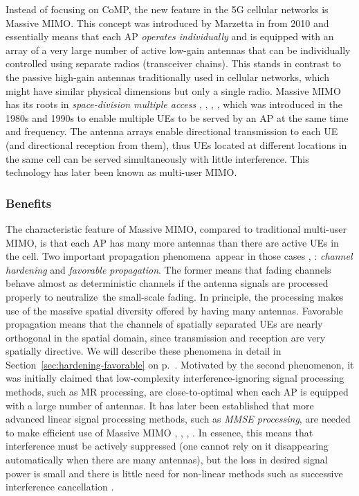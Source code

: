 Instead of focusing on \gls{CoMP}, the new feature in the 5G cellular networks is Massive \gls{MIMO}. This concept was introduced by Marzetta in \cite{Marzetta2010a} from 2010 and essentially means that each \gls{AP} \emph{operates individually} and is equipped with an array of a very large number of active low-gain antennas that can be individually controlled using separate radios (transceiver chains). This stands in contrast to the passive high-gain antennas traditionally used in cellular networks, which might have similar physical dimensions but only a single radio.
Massive \gls{MIMO} has its roots in \emph{space-division multiple access} \cite{Anderson1991a}, \cite{Richard1996a}, \cite{Swales1990a}, \cite{Winters1987a}, which was introduced in the 1980s and 1990s to enable multiple \glspl{UE} to be served by an \gls{AP} at the same time and frequency. The antenna arrays enable directional transmission to each \gls{UE} (and directional reception from them), thus \glspl{UE} located at different locations in the same cell can be served simultaneously with little interference.
This technology has later been known as multi-user \gls{MIMO}.

\enlargethispage{\baselineskip} 

\subsubsection{Benefits}

The characteristic feature of Massive \gls{MIMO}, compared to traditional multi-user MIMO, is that each \gls{AP} has many more antennas than there are active \glspl{UE}  in the cell. Two important propagation phenomena~appear in those cases \cite{Larsson2014a}, \cite{Rusek2013a}: \emph{channel hardening} and \emph{favorable propagation}. The former means that fading channels behave almost as deterministic channels if the antenna signals are processed properly to neutralize~the small-scale fading. In principle, the processing makes use of the massive spatial diversity offered by having many antennas. 
Favorable propagation means that the channels of spatially separated \glspl{UE} are nearly orthogonal in the spatial domain, since transmission and reception are very spatially directive. We will describe these phenomena in detail in Section~\ref{sec:hardening-favorable} on p.~\pageref{sec:hardening-favorable}.
Motivated by the second phenomenon, it was initially claimed that low-complexity interference-ignoring signal processing methods, such as \gls{MR} processing, are close-to-optimal when each \gls{AP} is equipped with a large number of antennas.
It has later been established that more advanced linear signal processing methods,  such as \emph{\gls{MMSE} processing}, are needed to make efficient use of Massive \gls{MIMO} \cite{BjornsonHS17}, \cite{Hoydis2013a}, \cite{Neumann2017a}, \cite{Sanguinetti2019a}. In essence, this means that interference must be actively suppressed (one cannot rely on it disappearing automatically when there are many antennas), but the loss in desired signal power is small and there is little need for non-linear methods such as successive interference cancellation \cite{massivemimobook}.

